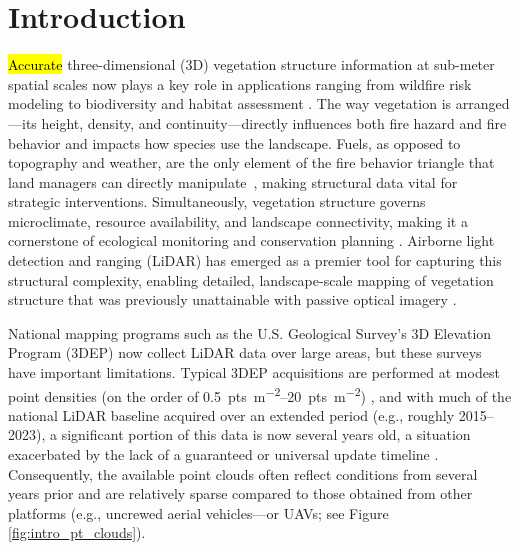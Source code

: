 \documentclass[remotesensing,article,accept,pdftex,moreauthors]{Definitions/mdpi}
\begin{document}



\section{Introduction}

\hl{Accurate} %
 three-dimensional (3D) vegetation structure information at sub-meter spatial scales now plays a key role in applications ranging from wildfire risk modeling \cite{martin-ducup_unlocking_2025} to biodiversity and habitat assessment \cite{Merrick2013Into3D,moudry2023vegetation}. The way vegetation is arranged—its height, density, and continuity—directly influences both fire hazard and fire behavior and impacts how species use the landscape. Fuels, as opposed to topography and weather, are the only element of the fire behavior triangle that land managers can directly \mbox{manipulate \cite{agee_influence_1996}}, making structural data vital for strategic interventions. Simultaneously, vegetation structure governs microclimate, resource availability, and landscape connectivity, making it a cornerstone of ecological monitoring and conservation planning \cite{guo2018integrating, mahata2023microclimate,ustin2021current}. Airborne light detection and ranging (LiDAR) has emerged as a premier tool for capturing this structural complexity, enabling detailed, landscape-scale mapping of vegetation structure that was previously unattainable with passive optical imagery \cite{Merrick2013Into3D, belov2019capabilities, guo2020lidar}.

National mapping programs such as the U.S. Geological Survey's 3D Elevation Program (3DEP) now collect LiDAR data over large areas, but these surveys have important limitations. Typical 3DEP acquisitions are performed at modest point densities (on the order of \qtyrange{0.5}{20}{pts\per\square\meter}) \cite{wu2016evaluating}, and with much of the national LiDAR baseline acquired over an extended period (e.g., roughly 2015--2023), a significant portion of this data is now several years old, a situation exacerbated by the lack of a guaranteed or universal update timeline \cite{usgs_what_2019}. Consequently, the available point clouds often reflect conditions from several years prior and are relatively sparse compared to those obtained from other platforms (e.g., uncrewed aerial vehicles---or UAVs; see Figure \ref{fig:intro_pt_clouds}).
\end{document}
